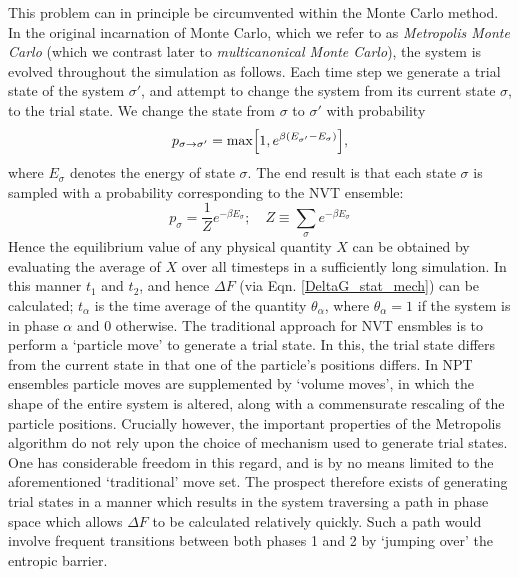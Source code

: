 \documentclass{report}
\begin{document}
This problem can in principle be circumvented within the Monte Carlo method.
In the original incarnation of Monte Carlo, which we refer to as \emph{Metropolis Monte Carlo}\cite{Metropolis_1953} (which we contrast later to 
\emph{multicanonical Monte Carlo}), the system is evolved throughout the simulation as follows. Each time step we generate a trial state of the system 
$\sigma'$, and attempt to change the system from its current state $\sigma$, to the trial state. We change the state from $\sigma$ to $\sigma'$ with 
probability
\begin{equation}\label{p_Metropolis}
p_{\sigma\to\sigma'}=\text{max}\Bigl[1,e^{\beta(E_{\sigma'}-E_{\sigma})}\Bigr],
\end{equation}
where $E_{\sigma}$ denotes the energy of state $\sigma$. The end result is that each state $\sigma$ is sampled with a probability
corresponding to the NVT ensemble:
\begin{equation}\label{MC_prob}
p_{\sigma}=\frac{1}{Z}e^{-\beta E_{\sigma}}; \quad Z\equiv\sum_{\sigma}e^{-\beta E_{\sigma}}
\end{equation}
Hence the equilibrium value of any physical quantity $X$ can be obtained by evaluating the average of $X$ over all timesteps in a sufficiently long 
simulation. In this manner $t_1$ and $t_2$, and hence $\Delta F$ (via Eqn. \eqref{DeltaG_stat_mech}) can be calculated; 
$t_{\alpha}$ is the time average of the quantity $\theta_{\alpha}$, where $\theta_{\alpha}=1$ if the system is in phase $\alpha$ and 0 otherwise.
The traditional approach for NVT ensmbles is to perform a `particle move' to generate a trial state. In this, the trial state differs from the
current state in that one of the particle's positions differs. In NPT ensembles particle moves are supplemented by `volume moves', in which the 
shape of the entire system is altered, along with a commensurate rescaling of the particle positions.
Crucially however, the important properties of the Metropolis algorithm do not rely upon the choice of mechanism used to generate trial states. 
One has considerable freedom in this regard, and is by no means limited to the aforementioned `traditional' move set. The prospect therefore exists 
of generating trial states in a manner which results in the system traversing a path in phase space which allows $\Delta F$ to be calculated 
relatively quickly. Such a path would involve frequent transitions between both phases 1 and 2 by `jumping over' the entropic barrier. 
\end{document}
